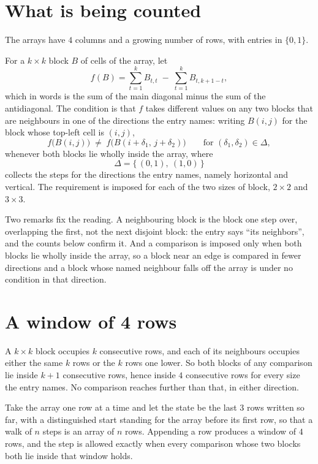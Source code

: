 \documentclass[11pt,a4paper]{article}
\theoremstyle{plain}
\theoremstyle{definition}
\begin{document}
\section{What is being counted}

The arrays have $4$ columns and a growing number of rows, with entries in $\{0,1\}$.

For a $k\times k$ block $B$ of cells of the array, let
\[
f(B)=\sum_{t=1}^{k}B_{t,t}\;-\;\sum_{t=1}^{k}B_{t,k+1-t} ,
\]
which in words is the sum of the main diagonal minus the sum of the antidiagonal. The condition is that $f$ takes different values on any two blocks that
are neighbours in one of the directions the entry names: writing $B(i,j)$ for the block whose
top-left cell is $(i,j)$,
\[
f\bigl(B(i,j)\bigr)\;\neq\;f\bigl(B(i+\delta_1,\,j+\delta_2)\bigr)
\qquad\text{for }(\delta_1,\delta_2)\in\Delta,
\]
whenever both blocks lie wholly inside the array, where
\[
\Delta=\{\,(0,1),\ (1,0)\,\}
\]
collects the steps for the directions the entry names, namely horizontal and vertical. The
requirement is imposed for each of the two sizes of block, $2\times2$ and $3\times3$.

Two remarks fix the reading. A neighbouring block is the block one step over, overlapping the
first, not the next disjoint block: the entry says ``its neighbors'', and the counts below
confirm it. And a comparison is imposed only when both blocks lie wholly inside the array, so a
block near an edge is compared in fewer directions and a block whose named neighbour falls off
the array is under no condition in that direction.

\section{A window of 4 rows}

A $k\times k$ block occupies $k$ consecutive rows, and each of its neighbours occupies either
the same $k$ rows or the $k$ rows one lower. So both blocks of any comparison lie inside $k+1$
consecutive rows, hence inside $4$ consecutive rows for every size the entry names. No
comparison reaches further than that, in either direction.

Take the array one row at a time and let the state be the last 3 rows written so far, with a
distinguished start standing for the array before its first row, so that a walk of $n$ steps is
an array of $n$ rows. Appending a row produces a window of $4$ rows, and the step is
allowed exactly when every comparison whose two blocks both lie inside that window holds.
\end{document}
